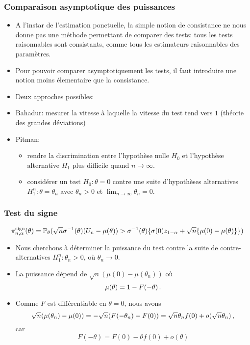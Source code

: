 \begin{frame}
\frametitle{Comparaison asymptotique des puissances}
\begin{itemize}
\item A l'instar de l'estimation ponctuelle, la simple notion de \alert{consistance} ne nous donne pas une méthode permettant de \alert{comparer} des tests: tous les tests \alert{raisonnables} sont consistants, comme tous les estimateurs \alert{raisonnables}  des paramètres.
\item Pour pouvoir comparer asymptotiquement les tests, il faut introduire une notion moins élementaire que la consistance.
\item Deux approches possibles:
\item \alert{Bahadur}: mesurer la vitesse à laquelle la vitesse du test tend vers $1$ (théorie des \alert{grandes déviations})
\item \alert{Pitman}:
\begin{itemize}
\item rendre la discrimination entre l'hypothèse nulle $H_0$ et l'hypothèse alternative $H_1$ plus \alert{difficile} quand $n \to \infty$.
\item \alert{considérer un test $H_0: \theta = 0$ contre \alert{une suite d'hypothèses alternatives} $H^n_1: \theta = \theta_n$ avec $\theta_n > 0$ et $\lim_{n \to \infty} \theta_n = 0$.}
\end{itemize}
\end{itemize}
\end{frame}

\begin{frame}
\frametitle{Test du signe}
$$
\pi^{\mathrm{sign}}_{n,\alpha}(\theta)=
\operatorname{{\mathbb P}}_\theta( \sqrt{n} \sigma^{-1}(\theta) (U_n - \mu(\theta)) > \sigma^{-1}(\theta) \{ \sigma(0) z_{1-\alpha} + \sqrt{n} \{\mu(0)-\mu(\theta)\}\})
$$
\begin{itemize}
\item  Nous cherchons à déterminer la puissance du test contre la suite de contre-alternatives $H_1^n: \theta_n > 0$, où $\theta_n \to 0$.
\item La puissance dépend de $\sqrt{n} (\mu(0) - \mu(\theta_n))$ où
\[
\mu(\theta) = 1 - F(-\theta) \,.
\]
\item Comme $F$ est différentiable en $\theta = 0$, nous avons
\[
\sqrt{n}(\mu(\theta_n) - \mu(0))= - \sqrt{n} ( F(-\theta_n) - F(0)) =  \sqrt{n} \theta_n f(0) + o(\sqrt{n} \theta_n) \,,
\]
car
\[
F(-\theta) = F(0) - \theta f(0) + o(\theta)
\]
\end{itemize}
\end{frame}

